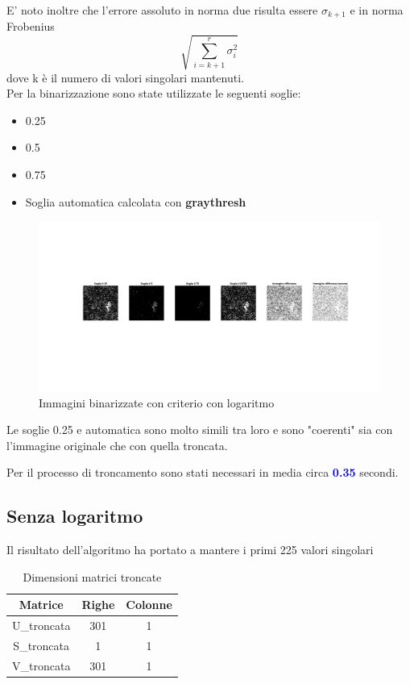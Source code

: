 \noindent
E' noto inoltre che l'errore assoluto in norma due risulta essere $\sigma_{k+1}$ e in norma Frobenius 
\begin{equation}
    \sqrt{\sum_{i=k+1}^{r}\sigma_i^2}
\end{equation}
 dove k è il numero di valori singolari mantenuti.\\
Per la binarizzazione sono state utilizzate le seguenti soglie:
\begin{itemize}
    \item 0.25
    \item 0.5
    \item 0.75
    \item Soglia automatica calcolata con \textbf{graythresh}
\end{itemize}

\begin{figure}[H]
    \centering
     \includegraphics[width=\textwidth]{images/Criterio5.jpg}
    \caption{Immagini binarizzate con criterio con logaritmo}
\end{figure}

\noindent Le soglie 0.25 e automatica sono molto simili tra loro e sono "coerenti" sia con l'immagine originale che con quella troncata.

\noindent Per il processo di troncamento sono stati necessari in media circa \textcolor{blue}{\textbf{0.35}} secondi.\\


\subsection{Senza logaritmo}


\noindent Il risultato dell'algoritmo ha portato a mantere i primi 225 valori singolari
 \begin{table}[H]
    \centering
    \begin{tabular}{|c|c|c|}
        \hline
        \textbf{Matrice} & \textbf{Righe} & \textbf{Colonne} \\
        \hline
        U\_troncata & 301 & 1 \\
        \hline
        S\_troncata & 1 & 1 \\
        \hline
        V\_troncata & 301 & 1 \\
        \hline
    \end{tabular}
    \caption{Dimensioni matrici troncate}
\end{table}

